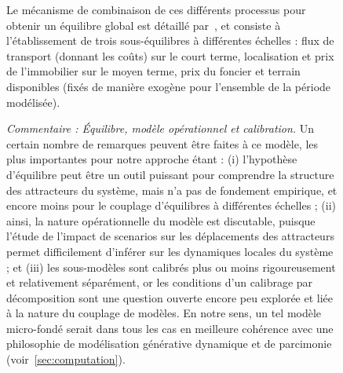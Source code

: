\begin{figure}
\begin{mdframed}
	Le mécanisme de combinaison de ces différents processus pour obtenir un équilibre global est détaillé par~\cite{kryvobokov2013comparison}, et consiste à l'établissement de trois sous-équilibres à différentes échelles : flux de transport (donnant les coûts) sur le court terme, localisation et prix de l'immobilier sur le moyen terme, prix du foncier et terrain disponibles (fixés de manière exogène pour l'ensemble de la période modélisée).
	
	\bigskip
	
	\textit{Commentaire : Équilibre, modèle opérationnel et calibration.} Un certain nombre de remarques peuvent être faites à ce modèle, les plus importantes pour notre approche étant : (i) l'hypothèse d'équilibre peut être un outil puissant pour comprendre la structure des attracteurs du système, mais n'a pas de fondement empirique, et encore moins pour le couplage d'équilibres à différentes échelles ; (ii) ainsi, la nature opérationnelle du modèle est discutable, puisque l'étude de l'impact de scenarios sur les déplacements des attracteurs permet difficilement d'inférer sur les dynamiques locales du système ; et (iii) les sous-modèles sont calibrés plus ou moins rigoureusement et relativement séparément, or les conditions d'un calibrage par décomposition sont une question ouverte encore peu explorée et liée à la nature du couplage de modèles. En notre sens, un tel modèle micro-fondé serait dans tous les cas en meilleure cohérence avec une philosophie de modélisation générative dynamique et de parcimonie (voir~\ref{sec:computation}).
	
	\medskip
	
	
	\end{mdframed}
\end{figure}

	
	
